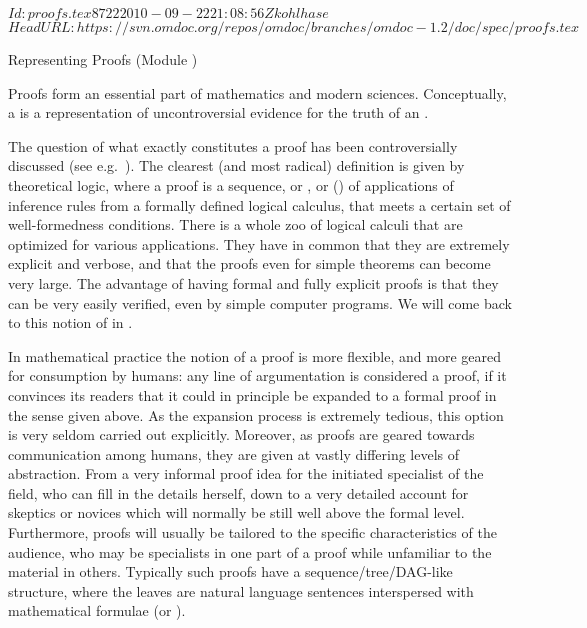 \svnInfo $Id: proofs.tex 8722 2010-09-22 21:08:56Z kohlhase $
\svnKeyword $HeadURL: https://svn.omdoc.org/repos/omdoc/branches/omdoc-1.2/doc/spec/proofs.tex $

\begin{tchapter}[id=proofs,short=Representing Proofs]{Representing Proofs (Module {})}

  Proofs form an essential part of mathematics and modern sciences.  Conceptually, a
  {} is a representation of uncontroversial evidence for the truth of an
  {}.
  
  The question of what exactly constitutes a proof has been controversially discussed (see
  e.g.~\cite{BarCoh:ecm01}). The clearest (and most radical) definition is given by
  theoretical logic, where a proof is a sequence, or {}, or
  {} ({})
  of applications of inference rules from a formally defined logical calculus, that meets
  a certain set of well-formedness conditions.  There is a whole zoo of logical
  calculi that are optimized for various applications. They have
  in common that they are extremely explicit and verbose, and that the proofs even for
  simple theorems can become very large. The advantage of having formal and fully explicit
  proofs is that they can be very easily verified, even by simple computer programs.  We
  will come back to this notion of {} in {}.

  In mathematical practice the notion of a proof is more flexible, and more geared for
  consumption by humans: any line of argumentation is considered a proof, if it convinces
  its readers that it could in principle be expanded to a formal proof in the sense given
  above. As the expansion process is extremely tedious, this option is very seldom carried
  out explicitly. Moreover, as proofs are geared towards communication among humans, they
  are given at vastly differing levels of abstraction. From a very informal proof idea for
  the initiated specialist of the field, who can fill in the details herself, down to a
  very detailed account for skeptics or novices which will normally be still well above
  the formal level. Furthermore, proofs will usually be tailored to the specific
  characteristics of the audience, who may be specialists in one part of a proof while
  unfamiliar to the material in others. Typically such proofs have a
  sequence/tree/DAG-like structure, where the leaves are natural language sentences
  interspersed with mathematical formulae (or {}).


\end{tchapter}
